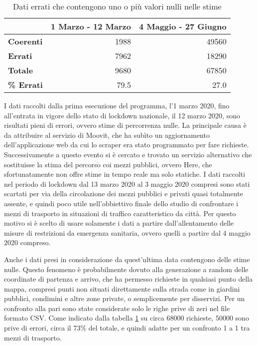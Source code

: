 \begin{table}[H]
\centering
\begin{tabular}{ | l | r | r | }
\hline

& \textbf{1 Marzo - 12 Marzo} & \textbf{4 Maggio - 27 Giugno} \\
\hline

\textbf{Coerenti}& 1988 & 49560 \\  
\textbf{Errati} & 7962 & 18290 \\
\hline
\textbf{Totale} & 9680 & 67850 \\
\textbf{\% Errati} & 79.5 & 27.0 \\
\hline
\end{tabular}
\caption{Dati errati che contengono uno o più valori nulli nelle stime}
\label{table:1}
\end{table}

I dati raccolti dalla prima esecuzione del programma, l'1 marzo 2020, fino all'entrata in vigore dello stato di lockdown nazionale, il 12 marzo 2020, sono risultati pieni di errori, ovvero stime di percorrenza nulle. La principale causa è da attribuire al servizio di Moovit, che ha subìto un aggiornamento dell'applicazione web da cui lo scraper era stato programmato per fare richieste. Successivamente a questo evento si è cercato e trovato un servizio alternativo che sostituisse la stima del percorso coi mezzi pubblici, ovvero Here, che sfortunatamente non offre stime in tempo reale ma solo statiche. I dati raccolti nel periodo di lockdown dal 13 marzo 2020 al 3 maggio 2020 compresi sono stati scartati per via della circolazione dei mezzi pubblici e privati quasi totalmente assente, e quindi poco utile nell'obbiettivo finale dello studio di confrontare i mezzi di trasporto in situazioni di traffico caratteristico da città. Per questo motivo si è scelto di usare solamente i dati a partire dall'allentamento delle misure di restrizioni da emergenza sanitaria, ovvero quelli a partire dal 4 maggio 2020 compreso.

Anche i dati presi in considerazione da quest'ultima data contengono delle stime nulle. Questo fenomeno è probabilmente dovuto alla generazione a random delle coordinate di partenza e arrivo, che ha permesso richieste in qualsiasi punto della mappa, compresi punti non situati direttamente sulla strada come in giardini pubblici, condimini e altre zone private, o semplicemente per disservizi. Per un confronto alla pari sono state considerate solo le righe prive di zeri nel file formato CSV. Come indicato dalla tabella \ref{table:1} su circa 68000 richieste, 50000 sono prive di errori, circa il 73\% del totale, e quindi adatte per un confronto 1 a 1 tra mezzi di trasporto.


